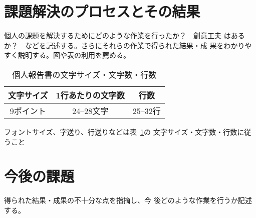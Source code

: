 \documentclass[twocolumn]{jsarticle}
\begin{document}
\section{課題解決のプロセスとその結果}
\begin{hissu}
個人の課題を解決するためにどのような作業を行ったか？　創意工夫
はあるか？　などを記述する。さらにそれらの作業で得られた結果・成
果をわかりやすく説明する。図や表の利用を薦める。
\end{hissu}
\begin{table}[htbp]
\begin{center}
\caption{個人報告書の文字サイズ・文字数・行数}\label{tab:hoge}
\begin{tabular}{ccc}
\hline
文字サイズ & 1行あたりの文字数& 行数\\
\hline
9ポイント  & 24--28文字       & 25--32行\\
\hline
\end{tabular}
\end{center}
\end{table}
\begin{hissu}
フォントサイズ、字送り、行送りなどは表~\ref{tab:hoge}の
文字サイズ・文字数・行数に従うこと
\end{hissu}

\section{今後の課題}
\begin{hissu}
 得られた結果・成果の不十分な点を指摘し、今
 後どのような作業を行うか記述する。
\end{hissu}
\end{document}
